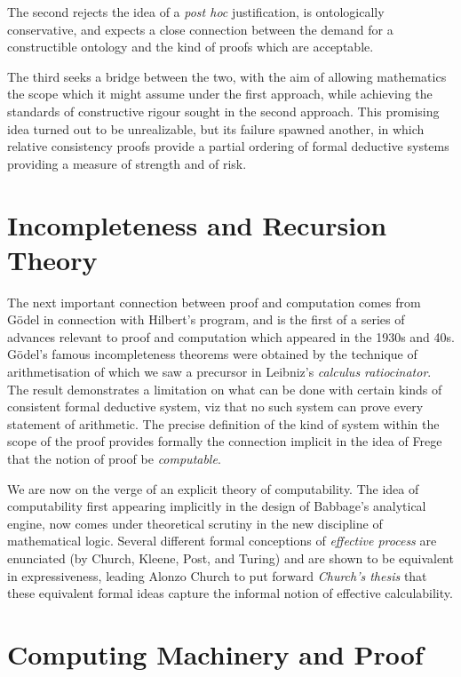 The second rejects the idea of a \emph{post hoc} justification, is
ontologically conservative, and expects a close connection between the
demand for a constructible ontology and the kind of proofs which are
acceptable.

The third seeks a bridge between the two, with the aim of allowing
mathematics the scope which it might assume under the first approach,
while achieving the standards of constructive rigour sought in the
second approach.
This promising idea turned out to be unrealizable, but its failure
spawned another, in which relative consistency proofs provide a
partial ordering of formal deductive systems providing a measure of
strength and of risk.

\section{Incompleteness and Recursion Theory}

The next important connection between proof and computation comes from
G\"odel in connection with Hilbert's program, and is the first of a
series of advances relevant to proof and computation which appeared in
the 1930s and 40s.
G\"odel's famous incompleteness theorems were obtained by the
technique of arithmetisation of which we saw a precursor in
Leibniz's \emph{calculus ratiocinator}.
The result demonstrates a limitation on what can be done with certain
kinds of consistent formal deductive system, viz that no such system
can prove every statement of arithmetic.
The precise definition of the kind of system within the scope of the
proof provides formally the connection implicit in the idea of Frege
that the notion of proof be \emph{computable}.

We are now on the verge of an explicit theory of computability.
The idea of computability first appearing implicitly in the design of
Babbage's analytical engine, now comes under theoretical scrutiny in
the new discipline of mathematical logic.
Several different formal conceptions of \emph{effective process} are
enunciated (by Church, Kleene, Post, and
Turing) and are
shown to be equivalent in expressiveness, leading Alonzo Church to put
forward \emph{Church's thesis} that these equivalent formal ideas
capture the informal notion of effective calculability. 

\section{Computing Machinery and Proof}

